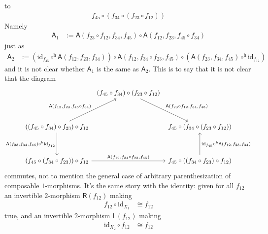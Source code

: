 to
\begin{align*}
  f_{45}
  \circ
  \left(
    f_{34}
    \circ
    \left(
      f_{23}
      \circ
      f_{12}
    \right)
  \right)
\end{align*}
Namely
\begin{align*}
  \mathsf{A}_{1}
  &:=
  \mathsf{A}(f_{23} \circ f_{12},f_{34},f_{45})
  \circ
  \mathsf{A}(f_{12},f_{23},f_{45} \circ f_{34})
\end{align*}
just as
\begin{align*}
  \mathsf{A}_{2}
  &:=
  \left(
    \mathrm{id}_{f_{45}}
    \circ^{\textrm{h}}
    \mathsf{A}(f_{12},f_{23},f_{34})
  \right)
  \circ
  \mathsf{A}(f_{12},f_{34} \circ f_{23},f_{45})
  \circ
  \left(
    \mathsf{A}(f_{23},f_{34},f_{45})
    \circ^{\textrm{h}}
    \mathrm{id}_{f_{12}}
  \right)
\end{align*}
and it is not clear whether $\mathsf{A}_{1}$ is the same as $\mathsf{A}_{2}$.
This is to say that it is not clear that the diagram
\[
\begin{tikzcd}[row sep=3.5em,column sep=0.4em]
  &
  (f_{45} \circ f_{34})
  \circ
  (f_{23} \circ f_{12})
  \arrow{dr}{\mathsf{A}(f_{23} \circ f_{12},f_{34},f_{45})}
  &
  \\
  \left(
    (f_{45} \circ f_{34})
    \circ
    f_{23}
  \right)
  \circ
  f_{12}
  \arrow{ur}{\mathsf{A}(f_{12},f_{23},f_{45} \circ f_{34})}
  \arrow[swap]{d}{\mathsf{A}(f_{23},f_{34},f_{45}) \circ^{\textrm{h}} \mathrm{id}_{f_{12}}}
  &
  &
  f_{45}
  \circ
  \left(
    f_{34}
    \circ
    (f_{23} \circ f_{12})
  \right)
  \\
  \left(
    f_{45}
    \circ
    (f_{34} \circ f_{23})
  \right)
  \circ
  f_{12}
  \arrow{rr}{\mathsf{A}(f_{12},f_{34} \circ f_{23},f_{45})}
  &
  &
  f_{45}
  \circ
  \left(
    (f_{34} \circ f_{23})
    \circ
    f_{12}
  \right)
  \arrow[swap]{u}{\mathrm{id}_{f_{45}} \circ^{\textrm{h}} \mathsf{A}(f_{12},f_{23},f_{34})}
\end{tikzcd}
\]
commutes, not to mention the general case of arbitrary parenthesization of composable $1$-morphisms.
It's the same story with the identity: given for all $f_{12}$ an invertible $2$-morphism $\mathsf{R}(f_{12})$ making 
\begin{align*}
  f_{12}
  \circ
  \mathrm{id}_{X_{1}}
  &\cong
  f_{12}
\end{align*}
true, and an invertible $2$-morphism $\mathsf{L}(f_{12})$ making 
\begin{align*}
  \mathrm{id}_{X_{2}}
  \circ
  f_{12}
  &\cong
  f_{12}
\end{align*}
